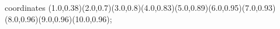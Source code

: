 					coordinates { (1.0,0.38)(2.0,0.7)(3.0,0.8)(4.0,0.83)(5.0,0.89)(6.0,0.95)(7.0,0.93)(8.0,0.96)(9.0,0.96)(10.0,0.96)};